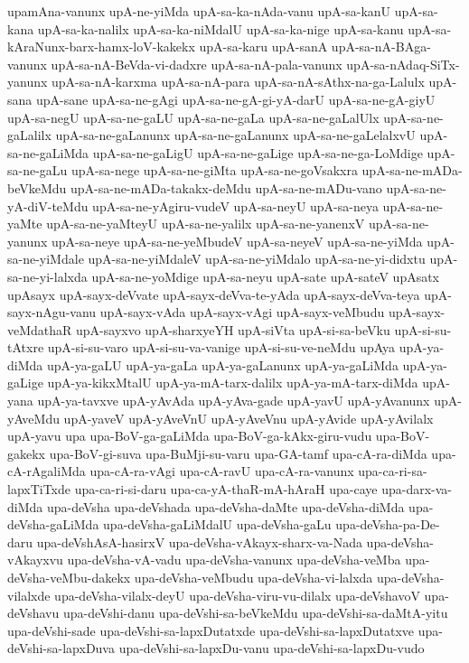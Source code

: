 {upamAna-vanunx
upA-ne-yiMda
upA-sa-ka-nAda-vanu
upA-sa-kanU
upA-sa-kana
upA-sa-ka-nalilx
upA-sa-ka-niMdalU
upA-sa-ka-nige
upA-sa-kanu
upA-sa-kAraNunx-barx-hamx-loV-kakekx
upA-sa-karu
upA-sanA
upA-sa-nA-BAga-vanunx
upA-sa-nA-BeVda-vi-dadxre
upA-sa-nA-pala-vanunx
upA-sa-nAdaq-SiTx-yanunx
upA-sa-nA-karxma
upA-sa-nA-para
upA-sa-nA-sAthx-na-ga-Lalulx
upA-sana
upA-sane
upA-sa-ne-gAgi
upA-sa-ne-gA-gi-yA-darU
upA-sa-ne-gA-giyU
upA-sa-negU
upA-sa-ne-gaLU
upA-sa-ne-gaLa
upA-sa-ne-gaLalUlx
upA-sa-ne-gaLalilx
upA-sa-ne-gaLanunx
upA-sa-ne-gaLanunx
upA-sa-ne-gaLelalxvU
upA-sa-ne-gaLiMda
upA-sa-ne-gaLigU
upA-sa-ne-gaLige
upA-sa-ne-ga-LoMdige
upA-sa-ne-gaLu
upA-sa-nege
upA-sa-ne-giMta
upA-sa-ne-goVsakxra
upA-sa-ne-mADa-beVkeMdu
upA-sa-ne-mADa-takakx-deMdu
upA-sa-ne-mADu-vano
upA-sa-ne-yA-diV-teMdu
upA-sa-ne-yAgiru-vudeV
upA-sa-neyU
upA-sa-neya
upA-sa-ne-yaMte
upA-sa-ne-yaMteyU
upA-sa-ne-yalilx
upA-sa-ne-yanenxV
upA-sa-ne-yanunx
upA-sa-neye
upA-sa-ne-yeMbudeV
upA-sa-neyeV
upA-sa-ne-yiMda
upA-sa-ne-yiMdale
upA-sa-ne-yiMdaleV
upA-sa-ne-yiMdalo
upA-sa-ne-yi-didxtu
upA-sa-ne-yi-lalxda
upA-sa-ne-yoMdige
upA-sa-neyu
upA-sate
upA-sateV
upAsatx
upAsayx
upA-sayx-deVvate
upA-sayx-deVva-te-yAda
upA-sayx-deVva-teya
upA-sayx-nAgu-vanu
upA-sayx-vAda
upA-sayx-vAgi
upA-sayx-veMbudu
upA-sayx-veMdathaR
upA-sayxvo
upA-sharxyeYH
upA-siVta
upA-si-sa-beVku
upA-si-su-tAtxre
upA-si-su-varo
upA-si-su-va-vanige
upA-si-su-ve-neMdu
upAya
upA-ya-diMda
upA-ya-gaLU
upA-ya-gaLa
upA-ya-gaLanunx
upA-ya-gaLiMda
upA-ya-gaLige
upA-ya-kikxMtalU
upA-ya-mA-tarx-dalilx
upA-ya-mA-tarx-diMda
upA-yana
upA-ya-tavxve
upA-yAvAda
upA-yAva-gade
upA-yavU
upA-yAvanunx
upA-yAveMdu
upA-yaveV
upA-yAveVnU
upA-yAveVnu
upA-yAvide
upA-yAvilalx
upA-yavu
upa
upa-BoV-ga-gaLiMda
upa-BoV-ga-kAkx-giru-vudu
upa-BoV-gakekx
upa-BoV-gi-suva
upa-BuMji-su-varu
upa-GA-tamf
upa-cA-ra-diMda
upa-cA-rAgaliMda
upa-cA-ra-vAgi
upa-cA-ravU
upa-cA-ra-vanunx
upa-ca-ri-sa-lapxTiTxde
upa-ca-ri-si-daru
upa-ca-yA-thaR-mA-hAraH
upa-caye
upa-darx-va-diMda
upa-deVsha
upa-deVshada
upa-deVsha-daMte
upa-deVsha-diMda
upa-deVsha-gaLiMda
upa-deVsha-gaLiMdalU
upa-deVsha-gaLu
upa-deVsha-pa-De-daru
upa-deVshAsA-hasirxV
upa-deVsha-vAkayx-sharx-va-Nada
upa-deVsha-vAkayxvu
upa-deVsha-vA-vadu
upa-deVsha-vanunx
upa-deVsha-veMba
upa-deVsha-veMbu-dakekx
upa-deVsha-veMbudu
upa-deVsha-vi-lalxda
upa-deVsha-vilalxde
upa-deVsha-vilalx-deyU
upa-deVsha-viru-vu-dilalx
upa-deVshavoV
upa-deVshavu
upa-deVshi-danu
upa-deVshi-sa-beVkeMdu
upa-deVshi-sa-daMtA-yitu
upa-deVshi-sade
upa-deVshi-sa-lapxDutatxde
upa-deVshi-sa-lapxDutatxve
upa-deVshi-sa-lapxDuva
upa-deVshi-sa-lapxDu-vanu
upa-deVshi-sa-lapxDu-vudo
}
